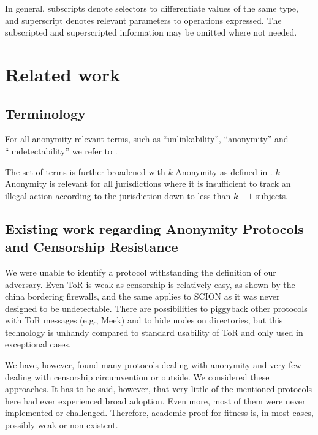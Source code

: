 \documentclass[acmsmall, screen, final, natbib=false]{acmart}
\begin{document}
	In general, subscripts denote selectors to differentiate values of the same type, and superscript denotes relevant parameters to operations expressed. The subscripted and superscripted information may be omitted where not needed.
	
	\section{Related work}
	\subsection{Terminology}
	For all anonymity relevant terms, such as ``unlinkability'', ``anonymity'' and ``undetectability'' we refer to \cite{anonTerminology}.
	
	The set of terms is further broadened with $k$-Anonymity as defined in \cite{k-anonymous:ccs2003}. $k$-Anonymity is relevant for all jurisdictions where it is insufficient to track an illegal action according to the jurisdiction down to less than $k-1$ subjects.
	
	\subsection{Existing work regarding Anonymity Protocols and Censorship Resistance}
	We were unable to identify a protocol withstanding the definition of our adversary. Even ToR is weak as censorship is relatively easy, as shown by the china bordering firewalls, and the same applies to SCION as it was never designed to be undetectable. There are possibilities to piggyback other protocols with ToR messages (e.g., Meek) and to hide nodes on directories, but this technology is unhandy compared to standard usability of ToR and only used in exceptional cases. 
	
	We have, however, found many protocols dealing with anonymity and very few dealing with censorship circumvention or outside. We considered these approaches. It has to be said, however, that very little of the mentioned protocols here had ever experienced broad adoption. Even more, most of them were never implemented or challenged. Therefore, academic proof for fitness is, in most cases, possibly weak or non-existent.
	
\end{document}
